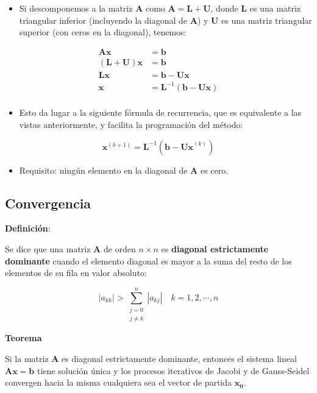 \documentclass[openany]{book}
\providecommand{\tightlist}{%
  \setlength{\itemsep}{0pt}\setlength{\parskip}{0pt}}
\begin{document}
\begin{itemize}
\tightlist
\item
  Si descomponemos a la matriz \(\mathbf{A}\) como \(\mathbf{A=L+U}\), donde \(\mathbf{L}\) es una matriz triangular inferior (incluyendo la diagonal de \(\mathbf{A}\)) y \(\mathbf{U}\) es una matriz triangular superior (con ceros en la diagonal), tenemos:
\end{itemize}

\begin{align*} 
\mathbf{Ax} &= \mathbf{b} \\
\mathbf{(L+U)x} &= \mathbf{b} \\
\mathbf{Lx} &= \mathbf{b} - \mathbf{Ux}  \\
\mathbf{x} &= \mathbf{L}^{-1} (\mathbf{b} - \mathbf{Ux})  \\
\end{align*}

\begin{itemize}
\tightlist
\item
  Esto da lugar a la siguiente fórmula de recurrencia, que es equivalente a las vistas anteriormente, y facilita la programación del método:
\end{itemize}

\[
\mathbf{x}^{(k+1)} = \mathbf{L}^{-1} (\mathbf{b} - \mathbf{Ux}^{(k)}) 
\]

\begin{itemize}
\tightlist
\item
  Requisito: ningún elemento en la diagonal de \(\mathbf{A}\) es cero.
\end{itemize}

\hypertarget{convergencia-1}{%
\subsection{Convergencia}\label{convergencia-1}}

\textbf{Definición}:

Se dice que una matriz \(\mathbf{A}\) de orden \(n \times n\) es \textbf{diagonal estrictamente dominante} cuando el elemento diagonal es mayor a la suma del resto de los elementos de su fila en valor absoluto:

\[
|a_{kk}| > \sum\limits_{\substack{j=0 \\ j\neq k}}^n |a_{kj}| \quad k=1, 2, \cdots, n
\]

\textbf{Teorema}

Si la matriz \(\mathbf{A}\) es diagonal estrictamente dominante, entonces el sistema lineal \(\mathbf{Ax=b}\) tiene solución única y los procesos iterativos de Jacobi y de Gauss-Seidel convergen hacia la misma cualquiera sea el vector de partida \(\mathbf{x_0}\).
\end{document}

